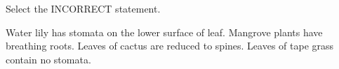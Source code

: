 


\begin{center}
\end{center}

\begin{questions}
    \question Select the INCORRECT statement.

    \begin{randomizechoices}
        \CorrectChoice Water lily has stomata on the lower surface of leaf.
        \choice Mangrove plants have breathing roots.
        \choice Leaves of cactus are reduced to spines.
        \choice Leaves of tape grass contain no stomata.
    \end{randomizechoices}

    
\end{questions}

